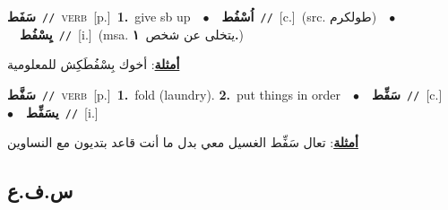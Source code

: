 \documentclass[10pt,a4paper,twoside]{article} %
\begin{document}
\begin{multicols}{2}
{\setlength\topsep{0pt}\textbf{\foreignlanguage{arabic}{سَفَط}}\ {\color{gray}\texttt{//}\color{black}}\ \textsc{verb}\ [p.]\ \textbf{1.}~give sb up\ \ $\bullet$\ \ \setlength\topsep{0pt}\textbf{\foreignlanguage{arabic}{اُسْفُط}}\ {\color{gray}\texttt{//}\color{black}}\ [c.]\ (src. \color{gray}\foreignlanguage{arabic}{طولكرم}\color{black})\ \ $\bullet$\ \ \setlength\topsep{0pt}\textbf{\foreignlanguage{arabic}{يِسْفُط}}\ {\color{gray}\texttt{//}\color{black}}\ [i.]\ \color{gray}(msa. \foreignlanguage{arabic}{يتخلى عن شخص}~\foreignlanguage{arabic}{\textbf{١.}})\color{black}\  \begin{flushright}\color{gray}\foreignlanguage{arabic}{\textbf{\underline{\foreignlanguage{arabic}{أمثلة}}}: أخوك بِسْفُطَكِش للمعلومية}\end{flushright}\color{black}} \vspace{2mm}

{\setlength\topsep{0pt}\textbf{\foreignlanguage{arabic}{سَفَّط}}\ {\color{gray}\texttt{//}\color{black}}\ \textsc{verb}\ [p.]\ \textbf{1.}~fold (laundry).  \textbf{2.}~put things in order\ \ $\bullet$\ \ \setlength\topsep{0pt}\textbf{\foreignlanguage{arabic}{سَفِّط}}\ {\color{gray}\texttt{//}\color{black}}\ [c.]\ \ $\bullet$\ \ \setlength\topsep{0pt}\textbf{\foreignlanguage{arabic}{يسَفِّط}}\ {\color{gray}\texttt{//}\color{black}}\ [i.]\  \begin{flushright}\color{gray}\foreignlanguage{arabic}{\textbf{\underline{\foreignlanguage{arabic}{أمثلة}}}: تعال سَفِّط الغسيل معي بدل ما أنت قاعد بتديون مع النساوين}\end{flushright}\color{black}} \vspace{2mm}

\vspace{-3mm}
\subsection*{\color{blue}\foreignlanguage{arabic}{س.ف.ع}\color{blue}{}} 


\end{multicols}
\end{document}
